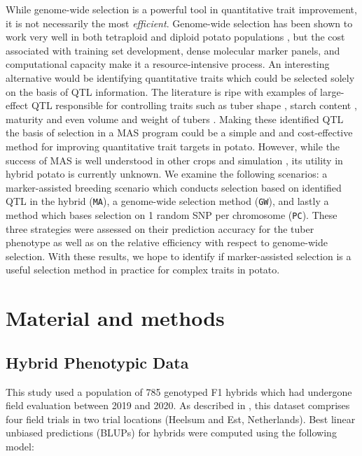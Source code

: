 While genome-wide selection is a powerful tool in quantitative trait
improvement, it is not necessarily the most \emph{efficient}.
Genome-wide selection has been shown to work very well in both
tetraploid and diploid potato populations
\autocite{Adams2023,Wilson2021}, but the cost associated with training
set development, dense molecular marker panels, and computational
capacity make it a resource-intensive process. An interesting
alternative would be identifying quantitative traits which could be
selected solely on the basis of QTL information. The literature is ripe
with examples of large-effect QTL responsible for controlling traits
such as tuber shape \autocite{Eck2022}, starch content
\autocite{Li2019a}, maturity \autocite{Li2018,Massa2015} and even volume
and weight of tubers \autocite{Korontzis2020,Clot2024}. Making these
identified QTL the basis of selection in a MAS program could be a simple
and and cost-effective method for improving quantitative trait targets in
potato. However, while the success of MAS is well understood in other
crops and simulation \autocite{Podlich2004, VanBerloo2008}, its utility in hybrid
potato is currently unknown. We examine the following scenarios: a
marker-assisted breeding scenario which conducts selection based on
identified QTL in the hybrid (\texttt{MA}), a genome-wide selection
method (\texttt{GW}), and lastly a method which bases selection on 1
random SNP per chromosome (\texttt{PC}). These three strategies were
assessed on their prediction accuracy for the tuber phenotype as well as
on the relative efficiency with respect to genome-wide selection. With
these results, we hope to identify if marker-assisted selection is a
useful selection method in practice for complex traits in potato.
\section{Material and methods}

\subsection{Hybrid Phenotypic Data}\label{hybrid-phenotypic-data}

This study used a population of 785 genotyped F1 hybrids which had
undergone field evaluation between 2019 and 2020. As described in
\autocite{Adams2023}, this dataset comprises four field trials in two
trial locations (Heelsum and Est, Netherlands). Best linear unbiased
predictions (BLUPs) for hybrids were computed using the following model:

